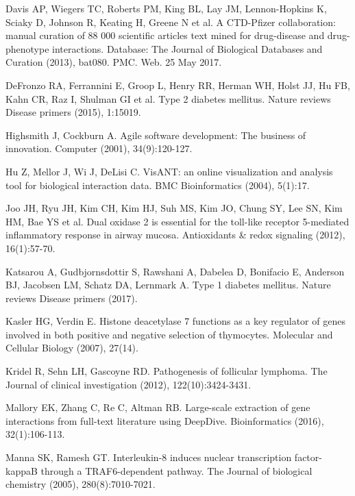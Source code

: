 \documentclass{ws-procs11x85}
\begin{document}
\begin{thebibliography}{10}

  Davis AP, Wiegers TC, Roberts PM, King BL, Lay JM, Lennon-Hopkins K, Sciaky D, Johnson R, Keating H, Greene N et al. A CTD-Pfizer collaboration: manual curation of 88 000 scientific articles text mined for drug-disease and drug-phenotype interactions. Database: The Journal of Biological Databases and Curation (2013), bat080. PMC. Web. 25 May 2017.

  DeFronzo RA, Ferrannini E, Groop L, Henry RR, Herman WH, Holst JJ, Hu FB, Kahn CR, Raz I, Shulman GI 
et al. Type 2 diabetes mellitus. Nature reviews Disease primers (2015), 1:15019.

 Highsmith J, Cockburn A. Agile software development: The business of innovation. Computer (2001), 34(9):120-127.

 Hu Z, Mellor J, Wi J, DeLisi C. VisANT: an online visualization and analysis tool for biological interaction data. BMC Bioinformatics (2004), 5(1):17. 

 Joo JH, Ryu JH, Kim CH, Kim HJ, Suh MS, Kim JO, Chung SY, Lee SN, Kim HM, Bae YS et al. Dual oxidase 2 is essential for the toll-like receptor 5-mediated inflammatory response in airway mucosa. Antioxidants \& redox signaling (2012), 16(1):57-70.

 Katsarou A, Gudbjornsdottir S, Rawshani A, Dabelea D, Bonifacio E, Anderson BJ, Jacobsen LM, Schatz DA, Lernmark A. Type 1 diabetes mellitus. Nature reviews Disease primers (2017). %

 Kasler HG, Verdin E. Histone deacetylase 7 functions as a key regulator of genes involved in both positive and negative selection of thymocytes.  Molecular and Cellular Biology (2007), 27(14). %

 Kridel R, Sehn LH, Gascoyne RD. Pathogenesis of follicular lymphoma. The Journal of clinical investigation (2012), 122(10):3424-3431.

 Mallory EK, Zhang C, Re C, Altman RB. Large-scale extraction of gene interactions from full-text literature using DeepDive. Bioinformatics (2016), 32(1):106-113. 

 Manna SK, Ramesh GT. Interleukin-8 induces nuclear transcription factor-kappaB through a TRAF6-dependent pathway. The Journal of biological chemistry (2005), 280(8):7010-7021.


\end{thebibliography}
\end{document}
